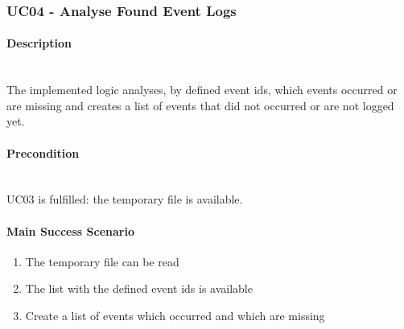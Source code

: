 \subsubsection{UC04 - Analyse Found Event Logs}
\begin{tcolorbox}
    \paragraph{Description} \ \\
    The implemented logic analyses, by defined event ids, which events occurred or are missing and creates a list of events that did not occurred or are not logged yet.
    \ \\
    \paragraph{Precondition} \ \\
    UC03 is fulfilled: the temporary file is available.
    \ \\
    \paragraph{Main Success Scenario} 
    \begin{enumerate}
        \item The temporary file can be read
        \item The list with the defined event ids is available
        \item Create a list of events which occurred and which are missing
    \end{enumerate}   
\end{tcolorbox}

